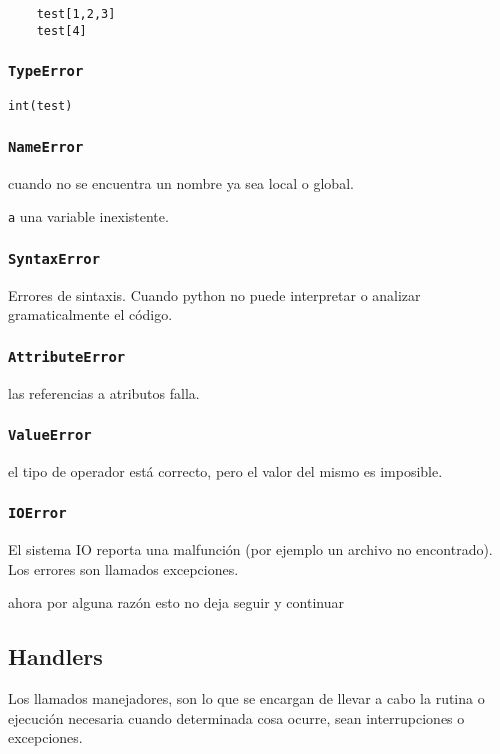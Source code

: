 \begin{verbatim}
    test[1,2,3]
    test[4]
\end{verbatim}

\subsubsection{\texttt{TypeError}}

\texttt{int(test)}

\subsubsection{\texttt{NameError}} cuando no se encuentra un nombre ya sea
local o global.

\texttt{a}
una variable inexistente.

\subsubsection{\texttt{SyntaxError}}

Errores de sintaxis. Cuando python no puede interpretar o analizar
gramaticalmente el código.

\subsubsection{\texttt{AttributeError}} las referencias a atributos falla.

\subsubsection{\texttt{ValueError}} el tipo de operador está correcto, pero el
valor del mismo es imposible.

\subsubsection{\texttt{IOError}} El sistema IO reporta una malfunción (por
ejemplo un archivo no encontrado). Los errores son llamados excepciones.

ahora por alguna razón esto no deja seguir y continuar

\subsection{Handlers}

Los llamados manejadores, son lo que se encargan de llevar a cabo la rutina o
ejecución necesaria cuando determinada cosa ocurre, sean interrupciones o
excepciones.

